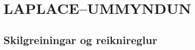 \newenvironment{se}{\begin{setning+}\sl}{\hfill$\square$\end{setning+}\rm}
\newenvironment{sex}{\begin{setning+}\sl}{\hfill$\blacksquare$\end{setning+}\rm}
\newenvironment{sk}{\begin{skilgreining+}\rm}{\hfill$\square$\end{skilgreining+}\rm}
\newenvironment{sesk}{\begin{setningogskilgreining+}\rm}{\hfill$\square$\end{setningogskilgreining+}\rm}
\newenvironment{hs}{\begin{hjalparsetning+}\sl}{\hfill$\square$\end{hjalparsetning+}\rm}
\newenvironment{fs}{\begin{fylgisetning+}\sl}{\hfill$\square$\end{fylgisetning+}\rm}
\newenvironment{sy}{\begin{synidaemi+}\rm}{\hfill$\square$\end{synidaemi+}\rm}
\newenvironment{fo}{\begin{forrit+}\rm}{\hfill\end{forrit+}\rm}
\newenvironment{so}{\medbreak\noindent{\it Sönnun:}\rm}{\hfill$\blacksquare$\rm}
\newenvironment{sotx}[1]{\medbreak\noindent{\it #1:}\rm}{\hfill$\blacksquare$\rm}
\newcommand{\aefing}{\section{Æfingardæmi} \setcounter{daemateljari}{1}}
\newcommand{\daemi}{
{\medskip\noindent{\bf \thedaemateljari.}}
\addtocounter{daemateljari}{1}
}

\def\svar#1{\smallskip\noindent{\bf #1.} \ }
\def\lausn#1{\smallskip\noindent{\bf #1.} \ }
\def\ugrein#1{\medbreak\noindent{\bf #1.} }
\newcommand{\samantekt}{\noindent{\bf Samantekt.} }

%

\chapter {LAPLACE--UMMYNDUN}
 

\section{ Skilgreiningar og reiknireglur}  

